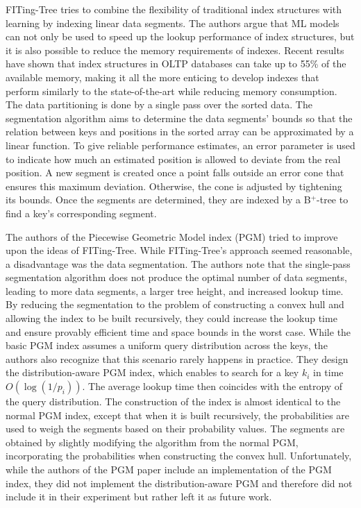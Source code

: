 FITing-Tree \cite{Galakatos2019} tries to combine the ﬂexibility of traditional index structures with learning by indexing linear data segments. The authors argue that ML models can not only be used to speed up the lookup performance of index structures, but it is also possible to reduce the memory requirements of indexes. Recent results \cite{Zhang2016} have shown that index structures in OLTP databases can take up to 55\% of the available memory, making it all the more enticing to develop indexes that perform similarly to the state-of-the-art while reducing memory consumption. The data partitioning is done by a single pass over the sorted data. The segmentation algorithm aims to determine the data segments' bounds so that the relation between keys and positions in the sorted array can be approximated by a linear function. To give reliable performance estimates, an error parameter is used to indicate how much an estimated position is allowed to deviate from the real position. A new segment is created once a point falls outside an error cone that ensures this maximum deviation. Otherwise, the cone is adjusted by tightening its bounds. Once the segments are determined, they are indexed by a B$^+$-tree to find a key's corresponding segment.

The authors of the Piecewise Geometric Model index (PGM) \cite{Ferragina:2020pgm} tried to improve upon the ideas of FITing-Tree. While FITing-Tree's approach seemed reasonable, a disadvantage was the data segmentation. The authors note that the single-pass segmentation algorithm does not produce the optimal number of data segments, leading to more data segments, a larger tree height, and increased lookup time. By reducing the segmentation to the problem of constructing a convex hull and allowing the index to be built recursively, they could increase the lookup time and ensure provably efficient time and space bounds in the worst case. While the basic PGM index assumes a uniform query distribution across the keys, the authors also recognize that this scenario rarely happens in practice. They design the distribution-aware PGM index, which enables to search for a key $k_i$ in time $O(\log (1/p_i))$. The average lookup time then coincides with the entropy of the query distribution. The construction of the index is almost identical to the normal PGM index, except that when it is built recursively, the probabilities are used to weigh the segments based on their probability values. The segments are obtained by slightly modifying the algorithm from the normal PGM, incorporating the probabilities when constructing the convex hull. Unfortunately, while the authors of the PGM paper include an implementation of the PGM index, they did not implement the distribution-aware PGM and therefore did not include it in their experiment but rather left it as future work. 

